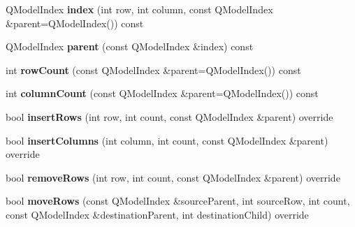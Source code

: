 \begin{DoxyCompactItemize}
\item 
Q\+Model\+Index {\bfseries index} (int row, int column, const Q\+Model\+Index \&parent=Q\+Model\+Index()) const \hypertarget{class_extendable_tree_item_model_aec310edeefe5367c14135f4912833148}{}\label{class_extendable_tree_item_model_aec310edeefe5367c14135f4912833148}

\item 
Q\+Model\+Index {\bfseries parent} (const Q\+Model\+Index \&index) const \hypertarget{class_extendable_tree_item_model_a20d33b970a4b657464e8a81a741b6260}{}\label{class_extendable_tree_item_model_a20d33b970a4b657464e8a81a741b6260}

\item 
int {\bfseries row\+Count} (const Q\+Model\+Index \&parent=Q\+Model\+Index()) const \hypertarget{class_extendable_tree_item_model_a0ae57bcc0927419e70dd6385d37731c9}{}\label{class_extendable_tree_item_model_a0ae57bcc0927419e70dd6385d37731c9}

\item 
int {\bfseries column\+Count} (const Q\+Model\+Index \&parent=Q\+Model\+Index()) const \hypertarget{class_extendable_tree_item_model_a8c21281b00c5c1553dc9c3d162333582}{}\label{class_extendable_tree_item_model_a8c21281b00c5c1553dc9c3d162333582}

\item 
bool {\bfseries insert\+Rows} (int row, int count, const Q\+Model\+Index \&parent) override\hypertarget{class_extendable_tree_item_model_a60423d77dbf3227fcf76e721c22ee591}{}\label{class_extendable_tree_item_model_a60423d77dbf3227fcf76e721c22ee591}

\item 
bool {\bfseries insert\+Columns} (int column, int count, const Q\+Model\+Index \&parent) override\hypertarget{class_extendable_tree_item_model_a0d3d16a109c3cac703ca20de6c50a45e}{}\label{class_extendable_tree_item_model_a0d3d16a109c3cac703ca20de6c50a45e}

\item 
bool {\bfseries remove\+Rows} (int row, int count, const Q\+Model\+Index \&parent) override\hypertarget{class_extendable_tree_item_model_a6657cfabdb3f8f696223b04a64661562}{}\label{class_extendable_tree_item_model_a6657cfabdb3f8f696223b04a64661562}

\item 
bool {\bfseries move\+Rows} (const Q\+Model\+Index \&source\+Parent, int source\+Row, int count, const Q\+Model\+Index \&destination\+Parent, int destination\+Child) override\hypertarget{class_extendable_tree_item_model_ac23f589bb25aaa93534b37e2d08f1cbd}{}\label{class_extendable_tree_item_model_ac23f589bb25aaa93534b37e2d08f1cbd}


\end{DoxyCompactItemize}
